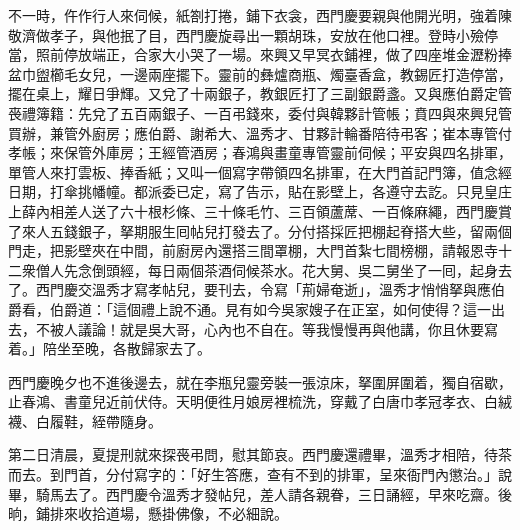 不一時，仵作行人來伺候，紙劄打捲，鋪下衣衾，西門慶要親與他開光明，強着陳敬濟做孝子，{}{}與他抿了目，西門慶旋尋出一顆胡珠，安放在他口裡。登時小殮停當，照前停放端正，合家大小哭了一場。來興又早冥衣鋪裡，做了四座堆金瀝粉捧盆巾盥櫛毛女兒，一邊兩座擺下。靈前的彝爐商瓶、燭臺香盒，教錫匠打造停當，擺在桌上，耀日爭輝。又兌了十兩銀子，教銀匠打了三副銀爵盞。又與應伯爵定管䘮禮簿籍：先兌了五百兩銀子、一百弔錢來，委付與韓夥計管帳；賁四與來興兒管買辦，兼管外廚房；應伯爵、謝希大、溫秀才、甘夥計輪番陪待弔客；崔本專管付孝帳；來保管外庫房；王經管酒房；春鴻與畫童專管靈前伺候；平安與四名排軍，單管人來打雲板、捧香紙；又叫一個寫字帶領四名排軍，在大門首記門簿，值念經日期，打傘挑幡幢。都派委已定，寫了告示，貼在影壁上，各遵守去訖。只見皇庄上薛內相差人送了六十根杉條、三十條毛竹、三百領蘆蓆、一百條麻繩，西門慶賞了來人五錢銀子，拏期服生囘帖兒打發去了。分付搭採匠把棚起脊搭大些，留兩個門走，把影壁夾在中間，前廚房內還搭三間罩棚，大門首紮七間榜棚，請報恩寺十二衆僧人先念倒頭經，每日兩個茶酒伺候茶水。花大舅、吳二舅坐了一囘，起身去了。西門慶交溫秀才寫孝帖兒，要刊去，令寫「荊婦奄逝」，溫秀才悄悄拏與應伯爵看，伯爵道：「這個禮上說不通。見有如今吳家嫂子在正室，如何使得？{}這一出去，不被人議論！就是吳大哥，心內也不自在。等我慢慢再與他講，你且休要寫着。」陪坐至晚，各散歸家去了。

西門慶晚夕也不進後邊去，就在李瓶兒靈旁裝一張涼床，拏圍屏圍着，獨自宿歇，止春鴻、書童兒近前伏侍。天明便徃月娘房裡梳洗，穿戴了白唐巾孝冠孝衣、白絨襪、白履鞋，絰帶隨身。

第二日清晨，夏提刑就來探䘮弔問，慰其節哀。西門慶還禮畢，溫秀才相陪，待茶而去。到門首，分付寫字的：「好生答應，查有不到的排軍，呈來衙門內懲治。」說畢，騎馬去了。西門慶令溫秀才發帖兒，差人請各親眷，三日誦經，早來吃齋。後晌，鋪排來收拾道場，懸掛佛像，不必細說。

